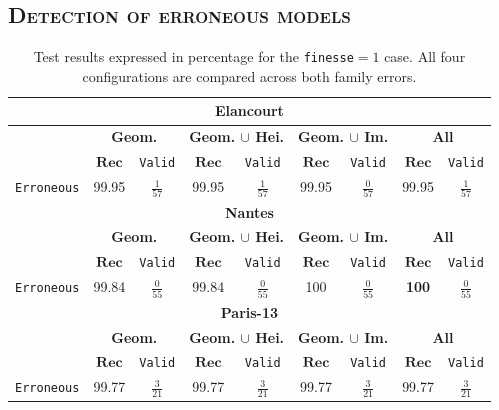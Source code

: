     \subsection{\textsc{Detection of erroneous models}}
        \label{subsec::more_experiments::finesse::1}
        \begin{table}
            \renewcommand{\arraystretch}{1.5}
            \begin{tabular}{|c | c c | c c | c c | c c |}
                \hline
                \multicolumn{9}{|c|}{\textbf{Elancourt}}\\
                \hline
                &\multicolumn{2}{c|}{\textbf{Geom.}} & \multicolumn{2}{c|}{\textbf{Geom. $\cup$ Hei.}} & \multicolumn{2}{c|}{\textbf{Geom. $\cup$ Im.}} & \multicolumn{2}{x{2.4cm}|}{\textbf{All}}\\
                \cline{2-9}
                & $\bm{Rec}$ & \texttt{Valid} &  $\bm{Rec}$ & \texttt{Valid} &  $\bm{Rec}$ & \texttt{Valid} &  $\bm{Rec}$ & \texttt{Valid} \\
                \hline
                \texttt{Erroneous} & 99.95 & $\frac{1}{57}$ & 99.95 & $\frac{1}{57}$ & 99.95 & $\frac{0}{57}$ & 99.95 & $\frac{1}{57}$ \\
                \hline
                \hline
                \multicolumn{9}{|c|}{\textbf{Nantes}}\\
                \hline
                &\multicolumn{2}{c|}{\textbf{Geom.}} & \multicolumn{2}{c|}{\textbf{Geom. $\cup$ Hei.}} & \multicolumn{2}{c|}{\textbf{Geom. $\cup$ Im.}} & \multicolumn{2}{x{2.4cm}|}{\textbf{All}}\\
                \cline{2-9}
                & $\bm{Rec}$ & \texttt{Valid} &  $\bm{Rec}$ & \texttt{Valid} &  $\bm{Rec}$ & \texttt{Valid} &  $\bm{Rec}$ & \texttt{Valid} \\
                \hline
                \texttt{Erroneous} & 99.84 & $\frac{0}{55}$ & 99.84 & $\frac{0}{55}$ & 100 & $\frac{0}{55}$ & \textbf{100} & $\frac{0}{55}$ \\
                \hline
                \hline
                \multicolumn{9}{|c|}{\textbf{Paris-13}}\\
                \hline
                &\multicolumn{2}{c|}{\textbf{Geom.}} & \multicolumn{2}{c|}{\textbf{Geom. $\cup$ Hei.}} & \multicolumn{2}{c|}{\textbf{Geom. $\cup$ Im.}} & \multicolumn{2}{x{2.4cm}|}{\textbf{All}}\\
                \cline{2-9}
                & $\bm{Rec}$ & \texttt{Valid} &  $\bm{Rec}$ & \texttt{Valid} &  $\bm{Rec}$ & \texttt{Valid} &  $\bm{Rec}$ & \texttt{Valid} \\
                \hline
                \texttt{Erroneous} & 99.77 & $\frac{3}{21}$ & 99.77 & $\frac{3}{21}$ & 99.77 & $\frac{3}{21}$ & 99.77 & $\frac{3}{21}$ \\
                \hline
            \end{tabular}
            \caption{\label{tab::ablation_f1}Test results expressed in percentage for the \texttt{finesse}$ =1$ case. All four configurations are compared across both family errors.}
        \end{table}
        
